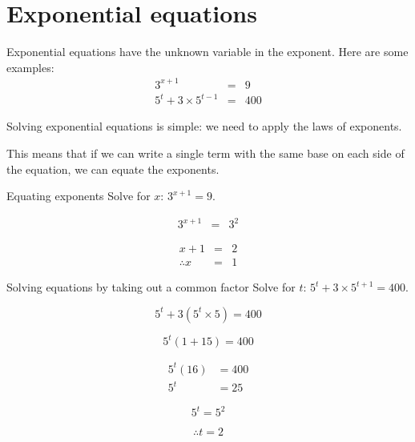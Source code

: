 \section{Exponential equations}

Exponential equations have the unknown variable in the exponent. Here are some examples:
\begin{eqnarray*}
 3^{x+1} & = & 9 \\
5^t + 3 \times 5^{t-1} & = & 400
\end{eqnarray*}

Solving exponential equations is simple: we need to apply the laws of exponents.


This means that if we can write a single term with the same base on each side of the equation, we can equate the exponents.

\begin{wex}
{Equating exponents}
{Solve for $x$: $3^{x+1} = 9$.}
{
\begin{eqnarray*}
 3^{x+1} & = & 3^2 
\end{eqnarray*}

\begin{eqnarray*}
 {x+1} & = & 2 \\
\therefore x & = & 1
\end{eqnarray*}
}
\end{wex}


\begin{wex}
{Solving equations by taking out a common factor}
{Solve for $t$: $5^t + 3 \times 5^{t+1} = 400$.}
{
\begin{equation*}
  5^t + 3 ( 5^t \times 5) = 400 
\end{equation*}

\begin{equation*}
 5^t(1 + 15) = 400 
\end{equation*}


\begin{align*}
 5^t(16) &= 400 \\
  5^t &= 25 
\end{align*}


\begin{equation*}
  5^t = 5^2 
\end{equation*}


\begin{equation*}
\therefore t = 2
\end{equation*}
}
\end{wex}

